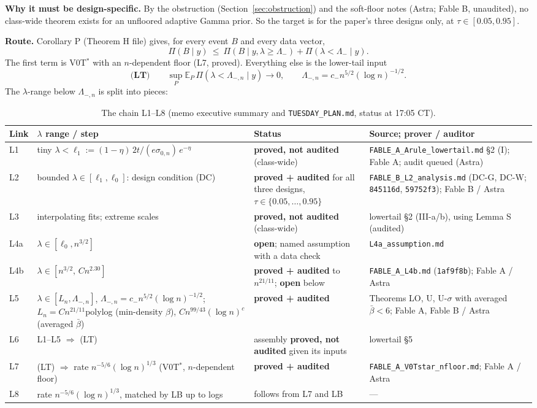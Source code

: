 \documentclass[11pt]{article}
\newcommand{\E}{\mathbb{E}}
\newcommand{\szero}{\sigma_{0,n}}
\newcommand{\supP}{\sup_{P}\E_P\,}
\newcommand{\PA}{\textcolor{proved}{\textbf{proved + audited}}}
\newcommand{\PU}{\textcolor{progress}{\textbf{proved, not audited}}}
\newcommand{\OP}{\textcolor{open}{\textbf{open}}}
\theoremstyle{plain}
\begin{document}
\noindent\textbf{Why it must be design-specific.} By the obstruction (Section~\ref{sec:obstruction}) and the soft-floor notes (Astra; Fable B, unaudited), no class-wide theorem exists for an unfloored adaptive Gamma prior. So the target is for the paper's three designs only, at $\tau\in[0.05,0.95]$.

\noindent\textbf{Route.} Corollary P (Theorem H file) gives, for every event $B$ and every data vector,
\[
\Pi(B\mid y)\ \le\ \Pi(B\mid y,\lambda\ge\Lambda_-)+\Pi(\lambda<\Lambda_-\mid y).
\]
The first term is V0T$^*$ with an $n$-dependent floor (L7, proved). Everything else is the lower-tail input
\[
\textbf{(LT)}\qquad \supP\Pi(\lambda<\Lambda_{-,n}\mid y)\to0,\qquad \Lambda_{-,n}=c_-n^{5/2}(\log n)^{-1/2}.
\]
The $\lambda$-range below $\Lambda_{-,n}$ is split into pieces:

\begin{table}[h]
\centering\small
\caption{The chain L1--L8 (memo executive summary and \texttt{TUESDAY\_PLAN.md}, status at 17:05 CT).}
\label{tab:chain}
\setlength{\tabcolsep}{3pt}
\begin{tabular}{@{}p{0.9cm}p{4.4cm}p{3.6cm}p{5.6cm}@{}}
\toprule
Link & $\lambda$ range / step & Status & Source; prover / auditor \\
\midrule
L1 & tiny $\lambda<\ell_1:=(1-\eta)\,2t/(e\szero)\,e^{-\eta}$ & \PU{} (class-wide) & \texttt{FABLE\_A\_Arule\_lowertail.md} \S2 (I); Fable A; audit queued (Astra) \\[2pt]
L2 & bounded $\lambda\in[\ell_1,\ell_0]$: design condition (DC) & \PA{} for all three designs, $\tau\in\{0.05,\dots,0.95\}$ & \texttt{FABLE\_B\_L2\_analysis.md} (DC-G, DC-W; \texttt{845116d}, \texttt{59752f3}); Fable B / Astra \\[2pt]
L3 & interpolating fits; extreme scales & \PU{} (class-wide) & lowertail \S2 (III-a/b), using Lemma S (audited) \\[2pt]
L4a & $\lambda\in[\ell_0,n^{3/2}]$ & \OP; named assumption with a data check & \texttt{L4a\_assumption.md} \\[2pt]
L4b & $\lambda\in[n^{3/2},\,C n^{2.30}]$ & \PA{} to $n^{21/11}$; \OP{} below & \texttt{FABLE\_A\_L4b.md} (\texttt{1af9f8b}); Fable A / Astra \\[2pt]
L5 & $\lambda\in[L_n,\Lambda_{-,n}]$, $\Lambda_{-,n}=c_-n^{5/2}(\log n)^{-1/2}$; $L_n=Cn^{21/11}$polylog (min-density $\beta$), $Cn^{99/43}(\log n)^c$ (averaged $\bar\beta$) & \PA & Theorems LO, U, U-$\sigma$ with averaged $\bar\beta<6$; Fable A, Fable B / Astra \\[2pt]
L6 & L1--L5 $\Rightarrow$ (LT) & assembly \PU{} given its inputs & lowertail \S5 \\[2pt]
L7 & (LT) $\Rightarrow$ rate $n^{-5/6}(\log n)^{1/3}$ (V0T$^*$, $n$-dependent floor) & \PA & \texttt{FABLE\_A\_V0Tstar\_nfloor.md}; Fable A / Astra \\[2pt]
L8 & rate $n^{-5/6}(\log n)^{1/3}$, matched by LB up to logs & follows from L7 and LB & --- \\
\bottomrule
\end{tabular}
\end{table}
\end{document}
